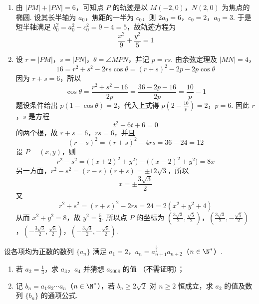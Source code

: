 \begin{solution}
\begin{enumerate}
\item 由 \(|PM|+|PN|=6\)，可知点 \(P\) 的轨迹是以 \(M(-2,0)\)，\(N(2,0)\) 为焦点的椭圆. 设其长半轴为 \(a_{0}\)，焦距的一半为 \(c_{0}\)，则
\(2a_{0}=6\)，\(c_{0}=2\)，\(a_{0}=3\).
于是短半轴满足 \(b_{0}^{2}=a_{0}^{2}-c_{0}^{2}=9-4=5\)，故轨迹方程为
\[
\frac{x^{2}}{9}+\frac{y^{2}}{5}=1
\]

\item 设 \(r=|PM|\)，\(s=|PN|\)，\(\theta=\angle MPN\)，并记 \(p=rs\). 由余弦定理及 \(|MN|=4\)，
\[
16=r^{2}+s^{2}-2rs\cos\theta=(r+s)^{2}-2p-2p\cos\theta
\]
因为 \(r+s=6\)，所以
\[
\cos\theta=\frac{r^{2}+s^{2}-16}{2p}=\frac{36-2p-16}{2p}=\frac{10}{p}-1
\]
题设条件给出 \(p(1-\cos\theta)=2\)，代入上式得
\(p\left(2-\frac{10}{p}\right)=2\)，\(p=6\).
因此 \(r\)，\(s\) 是方程
\[
t^{2}-6t+6=0
\]
的两个根，故 \(r+s=6\)，\(rs=6\)，并且
\[
(r-s)^{2}=(r+s)^{2}-4rs=36-24=12
\]
设 \(P=(x,y)\)，则
\[
r^{2}-s^{2}=\bigl((x+2)^{2}+y^{2}\bigr)-\bigl((x-2)^{2}+y^{2}\bigr)=8x
\]
另一方面，\(r^{2}-s^{2}=(r-s)(r+s)=\pm12\sqrt{3}\)，所以
\[
x=\pm\frac{3\sqrt{3}}{2}
\]
又
\[
r^{2}+s^{2}=(r+s)^{2}-2rs=24=2(x^{2}+y^{2}+4)
\]
从而 \(x^{2}+y^{2}=8\)，故 \(y^{2}=\frac{5}{4}\). 所以点 \(P\) 的坐标为
\(\left(\frac{3\sqrt{3}}{2},\frac{\sqrt{5}}{2}\right)\)，\(\left(\frac{3\sqrt{3}}{2},-\frac{\sqrt{5}}{2}\right)\)，\(\left(-\frac{3\sqrt{3}}{2},\frac{\sqrt{5}}{2}\right)\)，\(\left(-\frac{3\sqrt{3}}{2},-\frac{\sqrt{5}}{2}\right)\).
\end{enumerate}
\end{solution}

\begin{problem}
设各项均为正数的数列 \(\{a_{n}\}\) 满足 \(a_1 = 2\)，\(a_n = a_{n+1}^{\frac{3}{2}} a_{n+2}\)（\(n \in \N^*\)）.
\begin{enumerate}
\item 若 \(a_2 = \frac{1}{4}\)，求 \(a_3\)，\(a_4\) 并猜想 \(a_{2008}\) 的值 （不需证明）；
\item 记 \( b_n = a_1a_2 \cdots a_n \)（\( n \in \N^* \)），若 \( b_n \geqslant 2\sqrt{2} \) 对 \( n \geqslant 2 \) 恒成立，求 \( a_2 \) 的值及数列 \( \{b_n\} \) 的通项公式.
\end{enumerate}
\end{problem}

